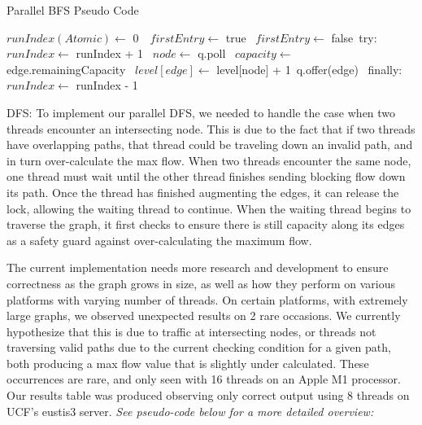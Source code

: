     \begin{algorithm} 
        \caption{Parallel BFS Pseudo Code}
        \label{alg:DParallel}
        \begin{algorithmic}[1]
            \State $runIndex(Atomic) \gets$ 0\
            \
                \State $firstEntry \gets$ true\
                    \State $firstEntry \gets$ false\
                    \State try:\
                        \State $runIndex \gets$ runIndex + 1\
                            \State $node \gets$ q.poll\
                                \State $capacity \gets$ edge.remainingCapacity\
                                    \State $level[edge] \gets$ level[node] + 1\
                                    \State q.offer(edge)\
                                \EndIf
                            \EndFor
                        \EndWhile    
                    \State finally:\
                        \State $runIndex \gets$ runIndex - 1\
                \EndWhile        
            \EndFunction
        \end{algorithmic}
    \end{algorithm}     
    DFS: To implement our parallel DFS, we needed to handle the case when two threads encounter an intersecting node. This is due to the fact that if two threads have overlapping paths, that thread could be traveling down an invalid path, and in turn over-calculate the max flow. When two threads encounter the same node, one thread must wait until the other thread finishes sending blocking flow down its path. Once the thread has finished augmenting the edges, it can release the lock, allowing the waiting thread to continue. When the waiting thread begins to traverse the graph, it first checks to ensure there is still capacity along its edges as a safety guard against over-calculating the maximum flow. 
    
    The current implementation needs more research and development to ensure correctness as the graph grows in size, as well as how they perform on various platforms with varying number of threads. On certain platforms, with extremely large graphs, we observed unexpected results on 2 rare occasions. We currently hypothesize that this is due to traffic at intersecting nodes, or threads not traversing valid paths due to the current checking condition for a given path, both producing a max flow value that is slightly under calculated. These occurrences are rare, and only seen with 16 threads on an Apple M1 processor. Our results table was produced observing only correct output using 8 threads on UCF's eustis3 server. \emph{See pseudo-code below for a more detailed overview:}
  
